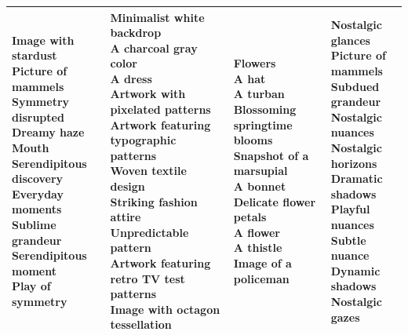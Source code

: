 \documentclass{article}
\begin{document}
\begin{table}[htbp]
\begin{tabular}{|p{4.0cm}|p{4.0cm}|p{4.0cm}|p{4.0cm}|}
\makecell[t]{Image with stardust \\ Picture of mammels \\ Symmetry disrupted \\ Dreamy haze \\ Mouth \\ Serendipitous discovery \\ Everyday moments \\ Sublime grandeur \\ Serendipitous moment \\ Play of symmetry} & \makecell[t]{Minimalist white backdrop \\ A charcoal gray color \\ A dress \\ Artwork with pixelated patterns \\ Artwork featuring typographic patterns \\ Woven textile design \\ Striking fashion attire \\ Unpredictable pattern \\ Artwork featuring retro TV test patterns \\ Image with octagon tessellation} & \makecell[t]{Flowers \\ A hat \\ A turban \\ Blossoming springtime blooms \\ Snapshot of a marsupial \\ A bonnet \\ Delicate flower petals \\ A flower \\ A thistle \\ Image of a policeman} & \makecell[t]{Nostalgic glances \\ Picture of mammels \\ Subdued grandeur \\ Nostalgic nuances \\ Nostalgic horizons \\ Dramatic shadows \\ Playful nuances \\ Subtle nuance \\ Dynamic shadows \\ Nostalgic gazes} \\
\hline

\end{tabular}
\end{table}
\end{document}
